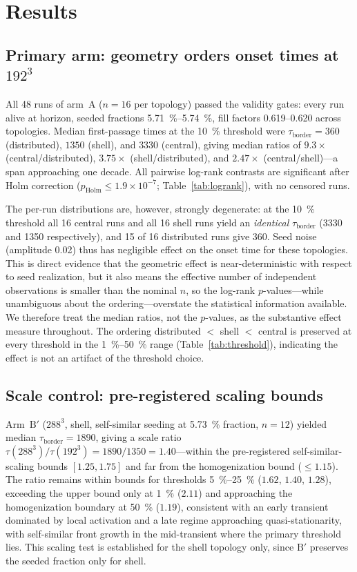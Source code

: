 \documentclass[aps,pre,preprint,superscriptaddress,nofootinbib,floatfix]{revtex4-2}
\newcommand{\tb}{\tau_{\mathrm{border}}}
\begin{document}
\section{Results}
\label{sec:results}

\subsection{Primary arm: geometry orders onset times at $192^3$}

All 48 runs of arm~A ($n=16$ per topology) passed the validity gates: every run alive at horizon, seeded fractions \SIrange{5.71}{5.74}{\percent}, fill factors \numrange{0.619}{0.620} across topologies. Median first-passage times at the \SI{10}{\percent} threshold were $\tb = 360$ (distributed), $1350$ (shell), and $3330$ (central), giving median ratios of $9.3\times$ (central/distributed), $3.75\times$ (shell/distributed), and $2.47\times$ (central/shell)---a span approaching one decade. All pairwise log-rank contrasts are significant after Holm correction ($p_{\mathrm{Holm}}\le1.9\times10^{-7}$; Table~\ref{tab:logrank}), with no censored runs.

The per-run distributions are, however, strongly degenerate: at the \SI{10}{\percent} threshold all 16 central runs and all 16 shell runs yield an \textit{identical} $\tb$ (3330 and 1350 respectively), and 15 of 16 distributed runs give 360. Seed noise (amplitude 0.02) thus has negligible effect on the onset time for these topologies. This is direct evidence that the geometric effect is near-deterministic with respect to seed realization, but it also means the effective number of independent observations is smaller than the nominal $n$, so the log-rank $p$-values---while unambiguous about the ordering---overstate the statistical information available. We therefore treat the median ratios, not the $p$-values, as the substantive effect measure throughout. The ordering distributed $<$ shell $<$ central is preserved at every threshold in the \SIrange{1}{50}{\percent} range (Table~\ref{tab:threshold}), indicating the effect is not an artifact of the threshold choice.

\subsection{Scale control: pre-registered scaling bounds}

Arm~$\mathrm{B}'$ ($288^3$, shell, self-similar seeding at \SI{5.73}{\percent} fraction, $n=12$) yielded median $\tb=1890$, giving a scale ratio $\tau(288^3)/\tau(192^3)=1890/1350=1.40$---within the pre-registered self-similar-scaling bounds $[1.25,1.75]$ and far from the homogenization bound (${\le}1.15$). The ratio remains within bounds for thresholds \SIrange{5}{25}{\percent} ($1.62$, $1.40$, $1.28$), exceeding the upper bound only at \SI{1}{\percent} ($2.11$) and approaching the homogenization boundary at \SI{50}{\percent} ($1.19$), consistent with an early transient dominated by local activation and a late regime approaching quasi-stationarity, with self-similar front growth in the mid-transient where the primary threshold lies. This scaling test is established for the shell topology only, since $\mathrm{B}'$ preserves the seeded fraction only for shell.
\end{document}
